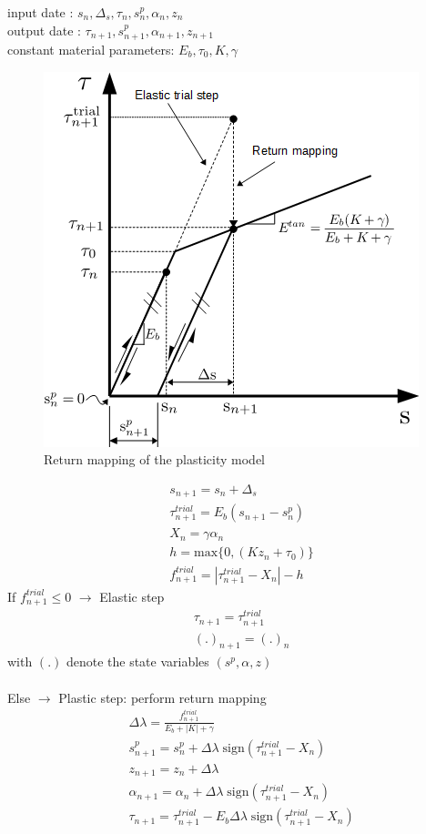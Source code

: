 \documentclass[main.tex]{subfiles}
\begin{document}
input date : $s_n,\Delta_s , \tau_n , s^p_n, \alpha_n , z_n$\\
output date : $ \tau_{n+1} , s^p_{n+1}, \alpha_{n+1} , z_{n+1}$\\
constant material parameters: $E_b, \tau_0, K, \gamma $
\begin{figure}[t]
	\centering
  \includegraphics[scale=0.6]{fig/PLasticity_return_mapping.png}
	\caption{Return mapping of the plasticity model}
	\label{FIGReturnMapping2}
\end{figure}
\begin{align*}
&s_{n+1} = s_n + \Delta_s \\
&\tau^{trial}_{n+1} = E_b (s_{n+1} - s^p_n)\\
&X_{n} = \gamma \alpha_n \\
&h = \mathrm{max}\{0 , (K z_n + \tau_0)\}\\
&f^{trial}_{n+1} = |\tau^{trial}_{n+1} - X_{n}| - h
\end{align*}
If $f^{trial}_{n+1} \leq 0$ $\longrightarrow$ Elastic step
\begin{align*}
&\tau_{n+1} = \tau^{trial}_{n+1}\\
&(.)_{n+1} = (.)_{n}
\end{align*}
with $(.)$ denote the state variables $(s^p, \alpha, z)$\\\\
Else $\longrightarrow$ Plastic step: perform return mapping
\begin{align*}
&\Delta \lambda = \frac{f^{trial}_{n+1}}{E_b + |K| + \gamma}\\
&s^p_{n+1} = s^p_{n} + \Delta \lambda \; \mathrm{sign}(\tau^{trial}_{n+1} - X_n)\\
&z_{n+1} = z_n + \Delta \lambda \\
&\alpha_{n+1} = \alpha_{n} + \Delta \lambda \;  \mathrm{sign}(\tau^{trial}_{n+1} - X_n)\\
& \tau_{n+1} = \tau^{trial}_{n+1} - E_b \Delta \lambda \; \mathrm{sign}(\tau^{trial}_{n+1} - X_{n})
\end{align*}
\end{document}

